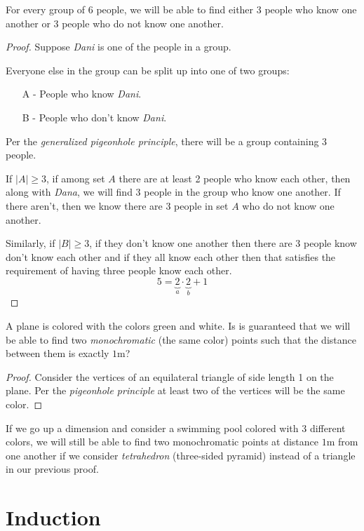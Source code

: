 \documentclass[00_complete]{subfiles}
\begin{document}
\begin{example}
    For every group of 6 people, we will be able to find either 3 people
    who know one another or 3 people who do not know one another.
\end{example}
\begin{proof}
    Suppose \emph{Dani} is one of the people in a group.

    Everyone else in the group can be split up into one of two groups:
    \begin{itemize}
        \item[A -] People who know \emph{Dani}.
        \item[B -] People who don't know \emph{Dani}.
    \end{itemize}
    Per the \emph{generalized pigeonhole principle}, there will be a group
    containing 3 people.

    If $|A|\geq 3$, if among set $A$ there are at least 2 people who know each other, then along
    with \emph{Dana}, we will find 3 people in the group who know one
    another. If there aren't, then we know there are 3 people in set $A$ who do
    not know one another.

    Similarly, if $|B|\geq3$, if they don't know one another then there are 3
    people know don't know each other and if they all know each other then that
    satisfies the requirement of having three people know each other.
    $$5=\underbrace{2}_{a}\cdot\underbrace{2}_{b}+1$$
\end{proof}

\begin{example}
    A plane is colored with the colors green and white. Is is guaranteed that
    we will be able to find two \emph{monochromatic} (the same color) points
    such that the distance between them is exactly $1$m?
    \begin{proof}
    Consider the vertices of an equilateral triangle of side length 1 on the
    plane. Per the \emph{pigeonhole principle} at least two of the vertices
    will be the same color.
\end{proof}
    If we go up a dimension and consider a swimming pool colored with 3
    different colors, we will still be able to find two monochromatic points at
    distance $1$m from one another if we consider \emph{tetrahedron}
    (three-sided pyramid) instead of a triangle in our previous proof.
\end{example}

\section{Induction}
\end{document}
